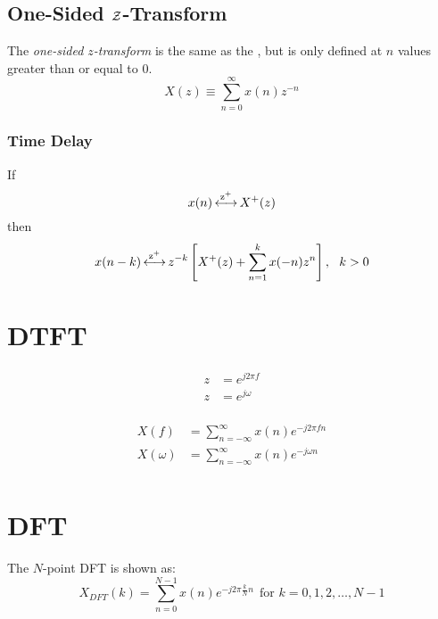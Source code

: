 \subsection{One-Sided \texorpdfstring{$\operatorname{\mathcal{Z}}$-Transform}{Z-Transform}}
The \emph{one-sided $z$-transform} is the same as the , but is only defined at $n$ values greater than or equal to 0.
\begin{equation}\label{eq:One-Sided Z-Transform}
  X(z) \equiv \sum_{n=0}^{\infty} x(n)z^{-n}
\end{equation}

\subsubsection{Time Delay}\label{subsubsec:One-Sided_Z-Transform_Properties-Time_Delay}
If
\begin{equation*}
  x(n) \operatorname{\overset{z^{+}}{\longleftrightarrow}} X^{+}(z)
\end{equation*}
then
\begin{equation}\label{eq:One-Sided_Z-Transform_Properties-Time_Delay}
  x(n-k) \operatorname{\overset{z^{+}}{\longleftrightarrow}} z^{-k} \left[ X^{+}(z) + \sum\limits_{n=1}^{k}x(-n)z^{n} \right], \:\:\: k>0
\end{equation}


\section{DTFT}
\begin{equation}\label{eq:1}
  \begin{aligned}
    z &= e^{j 2\pi f} \\
    z &= e^{j \omega} \\
  \end{aligned}
\end{equation}

\begin{equation}\label{eq:2}
  \begin{aligned}
    X(f) &= \sum\limits_{n=-\infty}^{\infty} x(n) e^{-j 2\pi f n} \\
    X(\omega) &= \sum\limits_{n=-\infty}^{\infty} x(n) e^{-j \omega n} \\
  \end{aligned}
\end{equation}

\section{DFT}
The $N$-point DFT is shown as:
\begin{equation}\label{eq:DFT}
  X_{DFT}(k) = \sum\limits_{n=0}^{N-1} x(n) e^{-j 2\pi \frac{k}{N} n} \:\: \text{for } k=0, 1, 2, \ldots, N-1
\end{equation}

